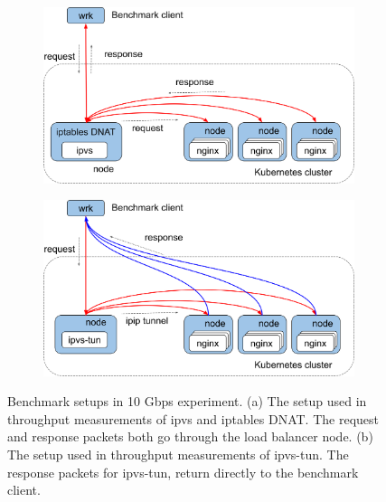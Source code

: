 \begin{figure}[h]
  \begin{subfigure}[t]{\columnwidth}
    \centering
    \includegraphics[width=0.8\columnwidth]{Figs/benchmark-schem-10g-nat}
    \par\bigskip
    \centering
    \begin{minipage}{0.9\columnwidth}
      \caption{}
      \label{fig:benchmark-schem-10g-nat}
    \end{minipage}
  \end{subfigure}

  \begin{subfigure}[t]{\columnwidth}
    \centering
    \includegraphics[width=0.8\columnwidth]{Figs/benchmark-schem-10g-dsr}
    \par\bigskip
    \centering
    \begin{minipage}{0.9\columnwidth}
      \caption{}
      \label{fig:benchmark-schem-10g-dsr}
    \end{minipage}
  \end{subfigure}

  \par\bigskip
  \centering
  \begin{minipage}{0.9\columnwidth}
    \caption[Benchmark setups in 10 Gbps experiment]{
      Benchmark setups in 10 Gbps experiment.
      (a) The setup used in throughput measurements of ipvs and iptables DNAT.
      The request and response packets both go through the load balancer node.
      (b) The setup used in throughput measurements of ipvs-tun.
      The response packets for ipvs-tun, return directly to the benchmark client.
    }
    \label{fig:benchmark-schem-10g}
  \end{minipage}
\end{figure}

